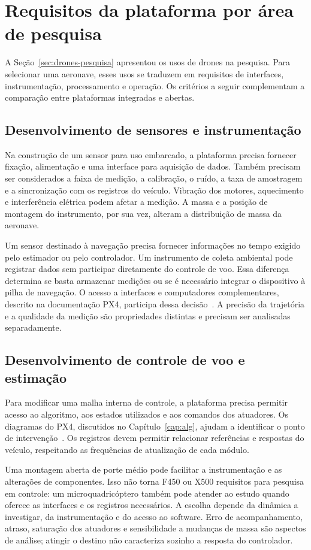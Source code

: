 \documentclass[11pt,a4paper,oneside]{book}
\numberwithin{equation}{chapter}
\begin{document}
\section{Requisitos da plataforma por área de pesquisa}\label{sec:areas-pesquisa}
A Seção~\ref{sec:drones-pesquisa} apresentou os usos de drones na pesquisa. Para selecionar uma aeronave, esses usos se traduzem em requisitos de interfaces, instrumentação, processamento e operação. Os critérios a seguir complementam a comparação entre plataformas integradas e abertas.

\subsection{Desenvolvimento de sensores e instrumentação}
Na construção de um sensor para uso embarcado, a plataforma precisa fornecer fixação, alimentação e uma interface para aquisição de dados. Também precisam ser considerados a faixa de medição, a calibração, o ruído, a taxa de amostragem e a sincronização com os registros do veículo. Vibração dos motores, aquecimento e interferência elétrica podem afetar a medição. A massa e a posição de montagem do instrumento, por sua vez, alteram a distribuição de massa da aeronave.

Um sensor destinado à navegação precisa fornecer informações no tempo exigido pelo estimador ou pelo controlador. Um instrumento de coleta ambiental pode registrar dados sem participar diretamente do controle de voo. Essa diferença determina se basta armazenar medições ou se é necessário integrar o dispositivo à pilha de navegação. O acesso a interfaces e computadores complementares, descrito na documentação PX4, participa dessa decisão~\cite{companion,px4montagem}. A precisão da trajetória e a qualidade da medição são propriedades distintas e precisam ser analisadas separadamente.

\subsection{Desenvolvimento de controle de voo e estimação}
Para modificar uma malha interna de controle, a plataforma precisa permitir acesso ao algoritmo, aos estados utilizados e aos comandos dos atuadores. Os diagramas do PX4, discutidos no Capítulo~\ref{cap:alg}, ajudam a identificar o ponto de intervenção~\cite{controle}. Os registros devem permitir relacionar referências e respostas do veículo, respeitando as frequências de atualização de cada módulo.

Uma montagem aberta de porte médio pode facilitar a instrumentação e as alterações de componentes. Isso não torna F450 ou X500 requisitos para pesquisa em controle: um microquadricóptero também pode atender ao estudo quando oferece as interfaces e os registros necessários. A escolha depende da dinâmica a investigar, da instrumentação e do acesso ao software. Erro de acompanhamento, atraso, saturação dos atuadores e sensibilidade a mudanças de massa são aspectos de análise; atingir o destino não caracteriza sozinho a resposta do controlador.
\end{document}

